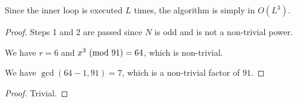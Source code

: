 \documentclass[../main.tex]{subfiles}
\begin{document}
\begin{enumerate}
    Since the inner loop is executed $L$ times, the algorithm is simply in $O(L^3)$.
\end{enumerate}

\bigskip
\begin{exercise}
\end{exercise}
\begin{proof}
Steps 1 and 2 are passed since $N$ is odd and is not a non-trivial power. 

We have $r=6$ and $x^3\ (\mathrm{mod}\ 91)=64$, which is non-trivial. 

We have $\gcd(64-1,91)=7$, which is a non-trivial factor of $91$.
\end{proof}

\bigskip
\begin{exercise}
\end{exercise}
\begin{proof}
Trivial.
\end{proof}
\end{document}
